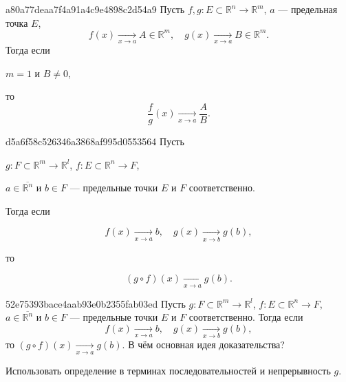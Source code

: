 \begin{note}{a80a77deaa7f4a91a4c9e4898c2d54a9}
    Пусть \({ f, g : E \subset \mathbb R^{n} \to \mathbb R^{m} }\),\: \({ a }\) --- предельная точка \({ E }\),
    \[
        f(x) \underset{x \to a}\longrightarrow A \in \mathbb R^{m}, \quad g(x) \underset{x \to a}\longrightarrow B \in \mathbb R^{m}.
    \]
    Тогда если \begin{icloze}{1}\({ m = 1 }\) и \({ B \neq 0 }\),\end{icloze} то
    \[
        \frac{f}{g}(x) \underset{x \to a}\longrightarrow \frac{A}{B}.
    \]
\end{note}

\begin{note}{d5a6f58c526346a3868af995d0553564}
    Пусть \begin{icloze}{4}\({ g : F \subset \mathbb R^{m} \to \mathbb R^{l} }\),\: \({ f : E \subset \mathbb R^{n} \to F }\),\end{icloze}\: \begin{icloze}{3}\({ a \in \overline{\mathbb R^{n}} }\) и \({ b \in F }\) --- предельные точки \({ E }\) и \({ F }\) соответственно.\end{icloze} Тогда если
    \begin{icloze}{2}
        \[
            f(x) \underset{x \to a}\longrightarrow b, \quad g(x) \underset{x \to b}\longrightarrow g(b),
        \]
    \end{icloze}
    то
    \begin{icloze}{1}
        \[
            (g \circ f)(x) \underset{x \to a}\longrightarrow g(b).
        \]
    \end{icloze}
\end{note}

\begin{note}{52e75393bace4aab93e0b2355fab03ed}
    Пусть \({ g : F \subset \mathbb R^{m} \to \mathbb R^{l} }\),\: \({ f : E \subset \mathbb R^{n} \to F }\),\: \({ a \in \overline{\mathbb R^{n}} }\) и \({ b \in F }\) --- предельные точки \({ E }\) и \({ F }\) соответственно. Тогда если
    \[
        f(x) \underset{x \to a}\longrightarrow b, \quad g(x) \underset{x \to b}\longrightarrow g(b),
    \]
    то \({ (g \circ f)(x) \underset{x \to a}\longrightarrow g(b) }\).
    В чём основная идея доказательства?

    \begin{cloze}{1}
        Использовать определение в терминах последовательностей и непрерывность \({ g }\).
    \end{cloze}
\end{note}

